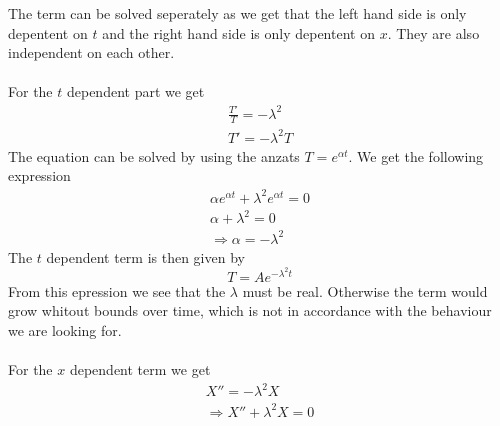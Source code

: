\documentclass{article}
\begin{document}
The term can be solved seperately as we get that the left hand side is only depentent on $t$ and the right hand side is only depentent on $x$. They are also independent on each other.\\
\\
For the $t$ dependent part we get
\begin{eqnarray}
\frac{T'}{T} = -\lambda^2 \\ 
T' = -\lambda^2 T
\end{eqnarray}
The equation can be solved by using the anzats $T = e^{\alpha t}$. We get the following expression
\begin{subequations}
\begin{eqnarray}
\alpha e^{\alpha t} + \lambda^2 e^{\alpha t} = 0 \\ 
\alpha +\lambda^2 = 0 \\ 
\Rightarrow \alpha = -\lambda^2
\end{eqnarray}
\end{subequations}
The $t$ dependent term is then given by
\begin{equation}
T = Ae^{-\lambda^2 t}
\end{equation}
From this epression we see that the $\lambda$ must be real. Otherwise the term would grow whitout bounds over time, which is not in accordance with the behaviour we are looking for. 
\\
\\
For the $x$ dependent term we get
\begin{subequations}
\begin{eqnarray}
X'' = -\lambda^2 X \\
\Rightarrow X'' + \lambda^2 X = 0 
\end{eqnarray}
\end{subequations}
\end{document}
